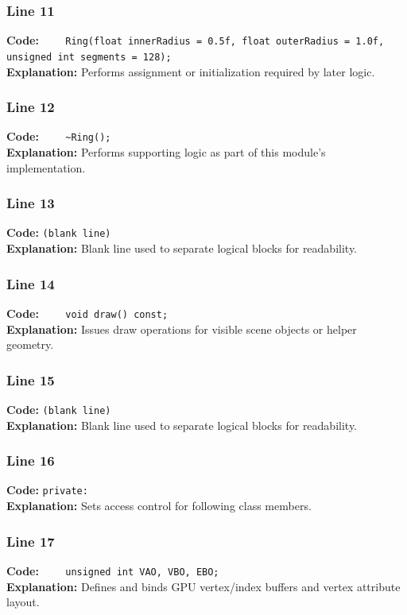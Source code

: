 \documentclass[11pt,a4paper]{article}
\begin{document}
\subsubsection*{Line 11}
\textbf{Code:} \verb|    Ring(float innerRadius = 0.5f, float outerRadius = 1.0f, unsigned int segments = 128);|\\
\textbf{Explanation:} Performs assignment or initialization required by later logic.

\subsubsection*{Line 12}
\textbf{Code:} \verb|    ~Ring();|\\
\textbf{Explanation:} Performs supporting logic as part of this module's implementation.

\subsubsection*{Line 13}
\textbf{Code:} \texttt{(blank line)}\\
\textbf{Explanation:} Blank line used to separate logical blocks for readability.

\subsubsection*{Line 14}
\textbf{Code:} \verb|    void draw() const;|\\
\textbf{Explanation:} Issues draw operations for visible scene objects or helper geometry.

\subsubsection*{Line 15}
\textbf{Code:} \texttt{(blank line)}\\
\textbf{Explanation:} Blank line used to separate logical blocks for readability.

\subsubsection*{Line 16}
\textbf{Code:} \verb|private:|\\
\textbf{Explanation:} Sets access control for following class members.

\subsubsection*{Line 17}
\textbf{Code:} \verb|    unsigned int VAO, VBO, EBO;|\\
\textbf{Explanation:} Defines and binds GPU vertex/index buffers and vertex attribute layout.
\end{document}
